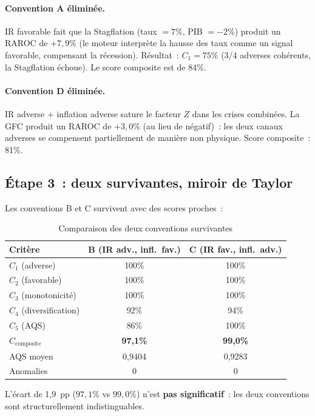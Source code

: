 \documentclass[12pt, a4paper, twoside, openright]{report}
\theoremstyle{definition}
\begin{document}
\paragraph{Convention A éliminée.} IR favorable fait que la Stagflation (taux $= 7\%$, PIB $= -2\%$) produit un RAROC de $+7{,}9\%$ (le moteur interprète la hausse des taux comme un signal favorable, compensant la récession). Résultat~: $C_1 = 75\%$ (3/4 adverses cohérents, la Stagflation échoue). Le score composite est de 84\%.

\paragraph{Convention D éliminée.} IR adverse + inflation adverse sature le facteur $Z$ dans les crises combinées. La GFC produit un RAROC de $+3{,}0\%$ (au lieu de négatif)~: les deux canaux adverses se compensent partiellement de manière non physique. Score composite~: 81\%.

\subsection{Étape 3~: deux survivantes, miroir de Taylor}

Les conventions B et C survivent avec des scores proches~:

\begin{table}[htbp]
\centering
\caption{Comparaison des deux conventions survivantes}
\label{tab:bc-compare}
\begin{tabular}{lcc}
\toprule
\textbf{Critère} & \textbf{B (IR adv., infl.\ fav.)} & \textbf{C (IR fav., infl.\ adv.)} \\
\midrule
$C_1$ (adverse) & 100\% & 100\% \\
$C_2$ (favorable) & 100\% & 100\% \\
$C_3$ (monotonicité) & 100\% & 100\% \\
$C_4$ (diversification) & 92\% & 94\% \\
$C_5$ (AQS) & 86\% & 100\% \\
\midrule
$C_{\text{composite}}$ & \textbf{97,1\%} & \textbf{99,0\%} \\
AQS moyen & 0,9404 & 0,9283 \\
Anomalies & 0 & 0 \\
\bottomrule
\end{tabular}
\end{table}

L'écart de 1,9~pp ($97{,}1\%$ vs $99{,}0\%$) n'est \textbf{pas significatif}~: les deux conventions sont structurellement indistinguables.
\end{document}
